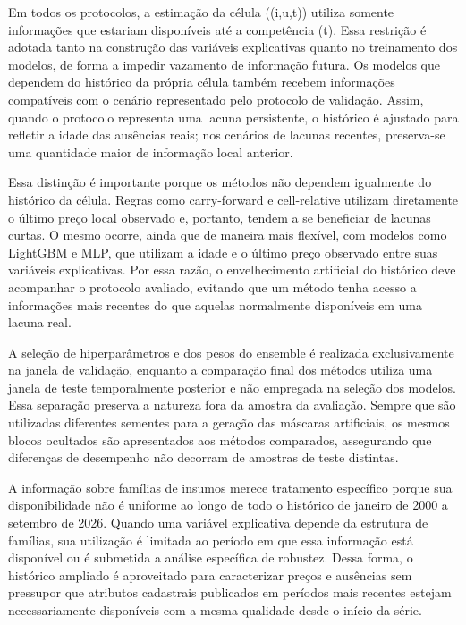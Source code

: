     
Em todos os protocolos, a estimação da célula ((i,u,t)) utiliza somente informações que estariam disponíveis até a competência (t). 
Essa restrição é adotada tanto na construção das variáveis explicativas quanto no treinamento dos modelos, de forma a 
impedir vazamento de informação futura. Os modelos que dependem do histórico da própria célula também recebem informações 
compatíveis com o cenário representado pelo protocolo de validação. Assim, quando o protocolo representa uma lacuna persistente, 
o histórico é ajustado para refletir a idade das ausências reais; nos cenários de lacunas recentes, preserva-se uma quantidade 
maior de informação local anterior.

Essa distinção é importante porque os métodos não dependem igualmente do histórico da célula. Regras como carry-forward e 
cell-relative utilizam diretamente o último preço local observado e, portanto, tendem a se beneficiar de lacunas curtas. 
O mesmo ocorre, ainda que de maneira mais flexível, com modelos como LightGBM e MLP, que utilizam a idade e o último preço 
observado entre suas variáveis explicativas. Por essa razão, o envelhecimento artificial do histórico deve acompanhar o 
protocolo avaliado, evitando que um método tenha acesso a informações mais recentes do que aquelas normalmente disponíveis em 
uma lacuna real.

A seleção de hiperparâmetros e dos pesos do ensemble é realizada exclusivamente na janela de validação, enquanto a comparação 
final dos métodos utiliza uma janela de teste temporalmente posterior e não empregada na seleção dos modelos. Essa separação 
preserva a natureza fora da amostra da avaliação. Sempre que são utilizadas diferentes sementes para a geração das máscaras 
artificiais, os mesmos blocos ocultados são apresentados aos métodos comparados, assegurando que diferenças de desempenho não 
decorram de amostras de teste distintas.

A informação sobre famílias de insumos merece tratamento específico porque sua disponibilidade não é uniforme ao longo de todo o 
histórico de janeiro de 2000 a setembro de 2026. Quando uma variável explicativa depende da estrutura de famílias, sua utilização 
é limitada ao período em que essa informação está disponível ou é submetida a análise específica de robustez. Dessa forma, o 
histórico ampliado é aproveitado para caracterizar preços e ausências sem pressupor que atributos cadastrais publicados em 
períodos mais recentes estejam necessariamente disponíveis com a mesma qualidade desde o início da série.

